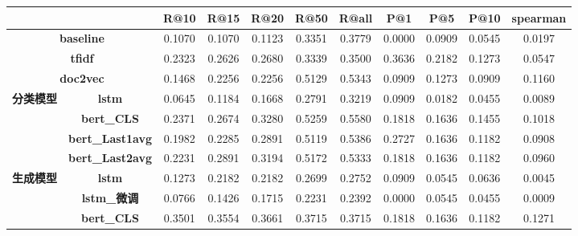\documentclass[11pt]{article}
\begin{document}
\begin{CJK}{UTF8}{gkai}
\begin{table}[htbp]\small
  \centering
    \begin{tabular}{c|c|c|c|c|c|c|c|c|c|c}
      \hline
      \multicolumn{2}{c|}{} & \textbf{R@10} & \textbf{R@15} & \textbf{R@20} & \textbf{R@50} & \textbf{R@all} & \textbf{P@1} & \textbf{P@5} & \textbf{P@10} & \textbf{spearman} \\
      \hline
      \multicolumn{2}{c|}{\textbf{baseline}} & 0.1070  & 0.1070  & 0.1123  & 0.3351  & 0.3779  & 0.0000  & 0.0909  & 0.0545  & 0.0197  \\
      \hline
      \multicolumn{2}{c|}{\textbf{tfidf}} & \textcolor[rgb]{ .502,  .502,  .502}{0.2323 } & \textcolor[rgb]{ .502,  .502,  .502}{0.2626 } & \textcolor[rgb]{ .502,  .502,  .502}{0.2680 } & \textcolor[rgb]{ .502,  .502,  .502}{0.3339 } & \textcolor[rgb]{ .502,  .502,  .502}{0.3500 } & \textcolor[rgb]{ .502,  .502,  .502}{0.3636 } & \textcolor[rgb]{ .502,  .502,  .502}{0.2182 } & \textcolor[rgb]{ .502,  .502,  .502}{0.1273 } & \textcolor[rgb]{ .502,  .502,  .502}{0.0547 } \\
      \hline
      \multicolumn{2}{c|}{\textbf{doc2vec}} & 0.1468  & 0.2256  & 0.2256  & 0.5129  & 0.5343  & 0.0909  & 0.1273  & 0.0909  & 0.1160  \\
      \hline
      \multirow{4}[0]{*}{\textbf{分类模型}} & \textbf{lstm} & 0.0645  & 0.1184  & 0.1668  & 0.2791  & 0.3219  & 0.0909  & 0.0182  & 0.0455  & 0.0089  \\
      & \textbf{bert\_CLS} & 0.2371  & 0.2674  & 0.3280  & 0.5259  & 0.5580  & 0.1818  & 0.1636  & 0.1455  & 0.1018  \\
      & \textbf{bert\_Last1avg} & 0.1982  & 0.2285  & 0.2891  & 0.5119  & 0.5386  & 0.2727  & 0.1636  & 0.1182  & 0.0908  \\
      & \textbf{bert\_Last2avg} & 0.2231  & 0.2891  & 0.3194  & 0.5172  & 0.5333  & 0.1818  & 0.1636  & 0.1182  & 0.0960  \\
      \hline
      \multirow{6}[0]{*}{\textbf{生成模型}} & \textbf{lstm} & 0.1273  & 0.2182  & 0.2182  & 0.2699  & 0.2752  & 0.0909  & 0.0545  & 0.0636  & 0.0045  \\
      & \textbf{lstm\_微调} & 0.0766  & 0.1426  & 0.1715  & 0.2231  & 0.2392  & 0.0000  & 0.0545  & 0.0455  & 0.0009  \\
      & \textbf{bert\_CLS} & 0.3501  & 0.3554  & 0.3661  & 0.3715  & 0.3715  & 0.1818  & 0.1636  & 0.1182  & 0.1271  \\

\end{tabular}
\end{table}
\end{CJK}
\end{document}

